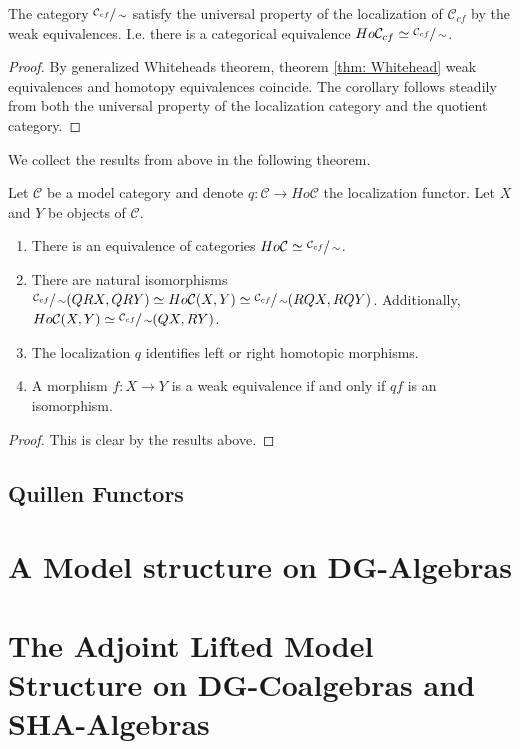 \documentclass[../thesis.tex]{subfiles}
\begin{document}
            \begin{corollary}
                The category $\sfrac{\mathcal{C}_{cf}}{\sim}$ satisfy the universal property of the localization of $\mathcal{C}_{cf}$ by the weak equivalences. I.e. there is a categorical equivalence $Ho\mathcal{C}_{cf} \simeq \sfrac{\mathcal{C}_{cf}}{\sim}$.
            \end{corollary}

            \begin{proof}
                By generalized Whiteheads theorem, theorem \ref{thm: Whitehead} weak equivalences and homotopy equivalences coincide. The corollary follows steadily from both the universal property of the localization category and the quotient category. 
            \end{proof}

            We collect the results from above in the following theorem.

            \begin{thm}
                Let $\mathcal{C}$ be a model category and denote $q: \mathcal{C} \rightarrow Ho\mathcal{C}$ the localization functor. Let $X$ and $Y$ be objects of $\mathcal{C}$.
                \begin{enumerate}
                    \item There is an equivalence of categories $Ho\mathcal{C}\simeq \sfrac{\mathcal{C}_{cf}}{\sim}$.
                    \item There are natural isomorphisms $\sfrac{\mathcal{C}_{cf}}{\sim}(QRX,QRY)\simeq Ho\mathcal{C}(X, Y) \simeq \sfrac{\mathcal{C}_{cf}}{\sim}(RQX, RQY)$. Additionally, $Ho\mathcal{C}(X, Y)\simeq \sfrac{\mathcal{C}_{cf}}{\sim}(QX, RY)$.
                    \item The localization $q$ identifies left or right homotopic morphisms.
                    \item A morphism $f: X \rightarrow Y$ is a weak equivalence if and only if $qf$ is an isomorphism.
                \end{enumerate}
            \end{thm}

            \begin{proof}
                This is clear by the results above.
            \end{proof}

        \subsection{Quillen Functors}

    \section{A Model structure on DG-Algebras}

    \section{The Adjoint Lifted Model Structure on DG-Coalgebras and SHA-Algebras}
\end{document}
